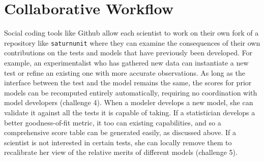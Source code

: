 \documentclass[9pt]{sig-alternate}
\newcommand{\verbx}[1]{\lstinline{#1}}
\begin{document}
%    
%
%
\section{Collaborative Workflow}\label{scidash}

Social coding tools like Github allow each scientist to work on their own fork of a repository like \verbx{saturnunit} where they can examine the consequences of their own contributions on  the tests and models that have previously been developed. For example, an experimentalist who has gathered new data can instantiate a new test or refine an existing one  with more accurate observations. As long as the interface between the test and the model remains the same, the scores for prior models can be recomputed entirely automatically, requiring no coordination with model developers (challenge 4). When a modeler develops a new model, she can   validate it against all the tests it is capable of taking. If a statistician develops a better goodness-of-fit metric, it too can existing capabilities, and so a comprehensive score table can be generated easily, as discussed above. If a scientist is not interested in certain tests, she can locally remove them to recalibrate her view of the relative merits of different models (challenge 5). 
\end{document}

